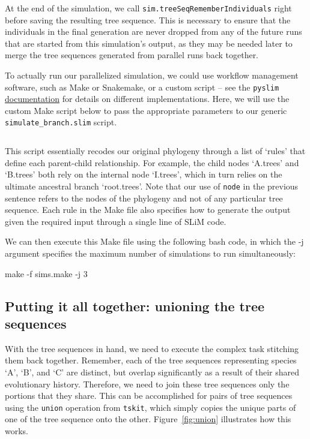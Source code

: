 \documentclass[12pt]{article}
\newcommand{\tskit}[0]{\texttt{tskit}\xspace}
\newcommand{\pyslim}[0]{\texttt{pyslim}\xspace}
\begin{document}
At the end of the simulation, we call \verb|sim.treeSeqRememberIndividuals| right before saving the resulting tree sequence.
This is necessary to ensure that the individuals in the final generation are never dropped from any of the future runs that are started from this simulation's output,
as they may be needed later to merge the tree sequences generated from parallel runs back together.

To actually run our parallelized simulation, we could use workflow management software, such as Make or Snakemake, or a custom script -- see the \pyslim
\href{https://tskit.dev/pyslim/docs/latest/vignette_parallel_phylo.html}{documentation} for details on different implementations. Here, we will use the custom Make script below to pass
the appropriate parameters to our generic \verb|simulate_branch.slim| script.

\inputminted[breaklines,fontsize=\small, breakanywhere=true, breakautoindent=true, linenos, bgcolor=gray!10]{basemake}{./code/parallelizing_phylogeny/parallel_sims.make}

This script essentially recodes our original phylogeny through a list of `rules' that define each parent-child relationship. For example, the child nodes `A.trees' and `B.trees' both
rely on the internal node `I.trees', which in turn relies on the ultimate ancestral branch `root.trees'. Note that our use of \verb|node| in the previous sentence refers to the nodes of the
phylogeny and not of any particular tree sequence. Each rule in the Make file also specifies how to generate the output given the required input through a single line of SLiM code.

We can then execute this Make file using the following bash code, in which the -j argument specifies the maximum number of simulations to run simultaneously:

make -f sims.make -j 3

\subsection{Putting it all together: unioning the tree sequences}

With the tree sequences in hand, we need to execute the complex task stitching them back together. Remember, each of the tree sequences representing species `A', `B', and `C'
are distinct, but overlap significantly as a result of their shared evolutionary history. Therefore, we need to join these tree sequences only the portions that they share. This can be
accomplished for pairs of tree sequences using the \verb|union| operation from \tskit, which simply copies the unique parts of one of the tree sequence onto the other.
Figure~\ref{fig:union} illustrates how this works.
\end{document}
